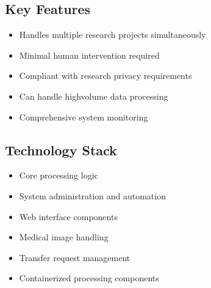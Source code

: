 \documentclass[letterpaper,10pt,english]{sphinxmanual}
\begin{document}
\subsection{Key Features}
\label{\detokenize{Temp/architecture-options:key-features}}\begin{itemize}
\item {} 
\sphinxAtStartPar
{} \sphinxhyphen{} Handles multiple research projects simultaneously

\item {} 
\sphinxAtStartPar
{} \sphinxhyphen{} Minimal human intervention required

\item {} 
\sphinxAtStartPar
{} \sphinxhyphen{} Compliant with research privacy requirements

\item {} 
\sphinxAtStartPar
{} \sphinxhyphen{} Can handle high\sphinxhyphen{}volume data processing

\item {} 
\sphinxAtStartPar
{} \sphinxhyphen{} Comprehensive system monitoring

\end{itemize}


\subsection{Technology Stack}
\label{\detokenize{Temp/architecture-options:technology-stack}}\begin{itemize}
\item {} 
\sphinxAtStartPar
{} \sphinxhyphen{} Core processing logic

\item {} 
\sphinxAtStartPar
{} \sphinxhyphen{} System administration and automation

\item {} 
\sphinxAtStartPar
{} \sphinxhyphen{} Web interface components

\item {} 
\sphinxAtStartPar
{} \sphinxhyphen{} Medical image handling

\item {} 
\sphinxAtStartPar
{} \sphinxhyphen{} Transfer request management

\item {} 
\sphinxAtStartPar
{} \sphinxhyphen{} Containerized processing components

\end{itemize}
\end{document}
